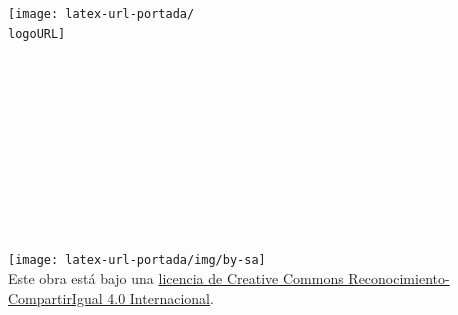 %
%


\begin{center}
\texttt{[image: latex-url-portada/\\logoURL]}~
\\[8mm]
\\
\\
\\[1cm]
\text{\large \nCurso} \\
\nAutor
\\[0.5cm]
\HBar \\[0.5cm]
\text{\LARGE\cTituloA}
\\[0.5cm]
\text{\LARGE\cTituloB} \\[0.5cm]
\HBar \\[1cm]
\cFecha\\[3mm]
\begin{minipage}{0.5\textwidth}
\centering 
\texttt{[image: latex-url-portada/img/by-sa]}\\
\tiny Este obra está bajo una \href{http://creativecommons.org/licenses/by-sa/4.0/}{licencia de Creative Commons Reconocimiento-CompartirIgual 4.0 Internacional}.
\end{minipage}
\end{center}
